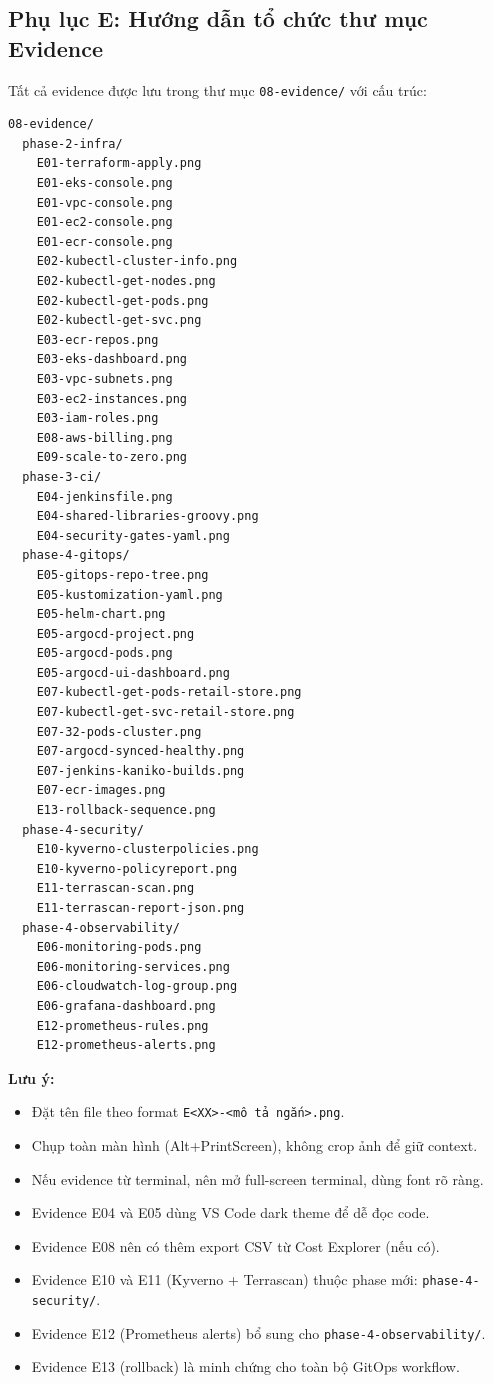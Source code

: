 \documentclass[13pt,a4paper,twoside]{extarticle}
\begin{document}
\subsection*{Phụ lục E: Hướng dẫn tổ chức thư mục Evidence}

Tất cả evidence được lưu trong thư mục \texttt{08-evidence/} với cấu trúc:

\begin{verbatim}
08-evidence/
  phase-2-infra/
    E01-terraform-apply.png
    E01-eks-console.png
    E01-vpc-console.png
    E01-ec2-console.png
    E01-ecr-console.png
    E02-kubectl-cluster-info.png
    E02-kubectl-get-nodes.png
    E02-kubectl-get-pods.png
    E02-kubectl-get-svc.png
    E03-ecr-repos.png
    E03-eks-dashboard.png
    E03-vpc-subnets.png
    E03-ec2-instances.png
    E03-iam-roles.png
    E08-aws-billing.png
    E09-scale-to-zero.png
  phase-3-ci/
    E04-jenkinsfile.png
    E04-shared-libraries-groovy.png
    E04-security-gates-yaml.png
  phase-4-gitops/
    E05-gitops-repo-tree.png
    E05-kustomization-yaml.png
    E05-helm-chart.png
    E05-argocd-project.png
    E05-argocd-pods.png
    E05-argocd-ui-dashboard.png
    E07-kubectl-get-pods-retail-store.png
    E07-kubectl-get-svc-retail-store.png
    E07-32-pods-cluster.png
    E07-argocd-synced-healthy.png
    E07-jenkins-kaniko-builds.png
    E07-ecr-images.png
    E13-rollback-sequence.png
  phase-4-security/
    E10-kyverno-clusterpolicies.png
    E10-kyverno-policyreport.png
    E11-terrascan-scan.png
    E11-terrascan-report-json.png
  phase-4-observability/
    E06-monitoring-pods.png
    E06-monitoring-services.png
    E06-cloudwatch-log-group.png
    E06-grafana-dashboard.png
    E12-prometheus-rules.png
    E12-prometheus-alerts.png
\end{verbatim}

\textbf{Lưu ý:}
\begin{itemize}[leftmargin=*,nosep]
  \item Đặt tên file theo format \texttt{E<XX>-<mô tả ngắn>.png}.
  \item Chụp toàn màn hình (Alt+PrintScreen), không crop ảnh để giữ context.
  \item Nếu evidence từ terminal, nên mở full-screen terminal, dùng font rõ ràng.
  \item Evidence E04 và E05 dùng VS Code dark theme để dễ đọc code.
  \item Evidence E08 nên có thêm export CSV từ Cost Explorer (nếu có).
  \item Evidence E10 và E11 (Kyverno + Terrascan) thuộc phase mới: \texttt{phase-4-security/}.
  \item Evidence E12 (Prometheus alerts) bổ sung cho \texttt{phase-4-observability/}.
  \item Evidence E13 (rollback) là minh chứng cho toàn bộ GitOps workflow.
\end{itemize}
\end{document}
